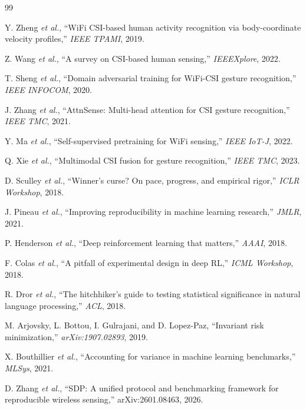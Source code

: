 \documentclass[journal,11pt]{IEEEtran}
\newcommand{\etal}{\textit{et al.}}
\begin{document}

\begin{thebibliography}{99}

 Y. Zheng \etal, ``WiFi CSI-based human activity recognition via body-coordinate velocity profiles,'' \emph{IEEE TPAMI}, 2019.

 Z. Wang \etal, ``A survey on CSI-based human sensing,'' \emph{IEEEXplore}, 2022.

 T. Sheng \etal, ``Domain adversarial training for WiFi-CSI gesture recognition,'' \emph{IEEE INFOCOM}, 2020.

 J. Zhang \etal, ``AttnSense: Multi-head attention for CSI gesture recognition,'' \emph{IEEE TMC}, 2021.

 Y. Ma \etal, ``Self-supervised pretraining for WiFi sensing,'' \emph{IEEE IoT-J}, 2022.

 Q. Xie \etal, ``Multimodal CSI fusion for gesture recognition,'' \emph{IEEE TMC}, 2023.

 D. Sculley \etal, ``Winner's curse? On pace, progress, and empirical rigor,'' \emph{ICLR Workshop}, 2018.

 J. Pineau \etal, ``Improving reproducibility in machine learning research,'' \emph{JMLR}, 2021.

 P. Henderson \etal, ``Deep reinforcement learning that matters,'' \emph{AAAI}, 2018.

 F. Colas \etal, ``A pitfall of experimental design in deep RL,'' \emph{ICML Workshop}, 2018.

 R. Dror \etal, ``The hitchhiker's guide to testing statistical significance in natural language processing,'' \emph{ACL}, 2018.

 M. Arjovsky, L. Bottou, I. Gulrajani, and D. Lopez-Paz, ``Invariant risk minimization,'' \emph{arXiv:1907.02893}, 2019.

 X. Bouthillier \etal, ``Accounting for variance in machine learning benchmarks,'' \emph{MLSys}, 2021.

 D. Zhang \etal, ``SDP: A unified protocol and benchmarking framework for reproducible wireless sensing,'' arXiv:2601.08463, 2026.


\end{thebibliography}
\end{document}
